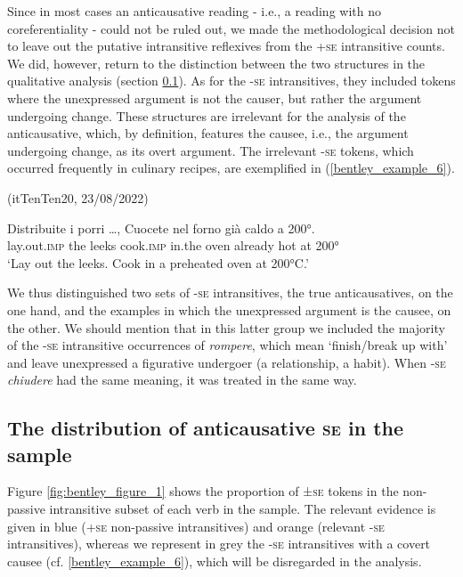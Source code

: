 \documentclass[output=paper,colorlinks,citecolor=brown
]{langscibook}
\begin{document}
Since in most cases an anticausative reading - i.e., a reading with no coreferentiality - could not be ruled out, we made the methodological decision not to leave out the putative intransitive reflexives from the +\textsc{se} intransitive counts. We did, however, return to the distinction between the two structures in the qualitative analysis (section \ref{bentley_section_3.2}).
As for the -\textsc{se} intransitives, they included tokens where the unexpressed argument is not the causer, but rather the argument undergoing change. These structures are irrelevant for the analysis of the anticausative, which, by definition, features the causee, i.e., the argument undergoing change, as its overt argument. The irrelevant -\textsc{se} tokens, which occurred frequently in culinary recipes, are exemplified in (\ref{bentley_example_6}).


\hspace*{\fill}(itTenTen20, 23/08/2022)\quad

\ea \label{bentley_example_6}
\gll Distribuite i porri  \ldots , Cuocete nel forno già caldo a 200°. \\
    lay.out.\textsc{imp}	the	leeks {} cook.\textsc{imp} in.the oven already hot at 200° \\
\glt ‘Lay out the leeks. Cook in a preheated oven at 200°C.’ 
\z

We thus distinguished two sets of -\textsc{se} intransitives, the true anticausatives, on the one hand, and the examples in which the unexpressed argument is the causee, on the other. We should mention that in this latter group we included the majority of the -\textsc{se} intransitive occurrences of \textit{rompere}, which mean ‘finish/break up with’ and leave unexpressed a figurative undergoer (a relationship, a habit). When -\textsc{se} \textit{chiudere} had the same meaning, it was treated in the same way. 

\subsection{The distribution of anticausative \textsc{se} in the sample}
\label{bentley_section_3.2}
Figure \ref{fig:bentley_figure_1} shows the proportion of ±\textsc{se} tokens in the non-passive intransitive subset of each verb in the sample. The relevant evidence is given in blue (+\textsc{se} non-passive intransitives) and orange (relevant -\textsc{se} intransitives), whereas we represent in grey the -\textsc{se} intransitives with a covert causee (cf. \ref{bentley_example_6}), which will be disregarded in the analysis.
\end{document}
